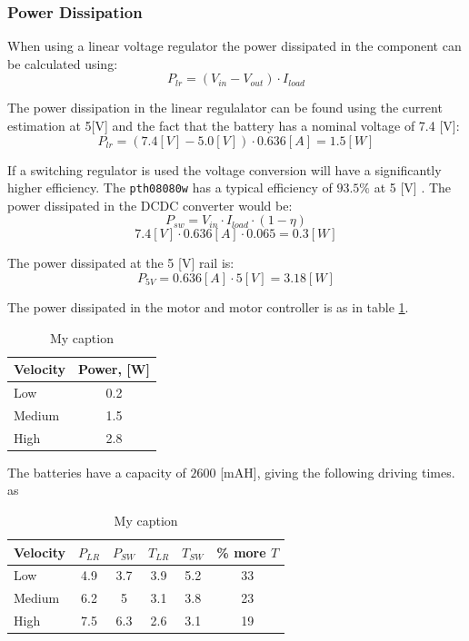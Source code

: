 \subsubsection{Power Dissipation} %
\label{sec:power_dissipation}
When using a linear voltage regulator the power dissipated in the component can be calculated using:
$$P_{lr} = (V_{in} - V_{out}) \cdot I_{load}$$

The power dissipation in the linear regulalator can be found using the current estimation at 5[V] and the fact that the battery has a nominal voltage of 7.4 [V]:
$$P_{lr} = (7.4 [V] - 5.0 [V]) \cdot 0.636 [A] = 1.5 [W]$$

If a switching regulator is used the voltage conversion will have a significantly higher efficiency.
The \texttt{pth08080w} has a typical efficiency of $93.5\%$ at 5 [V] \cite{pth08080}.
The power dissipated in the DCDC converter would be:
$$P_{sw} = V_{in} \cdot I_{load} \cdot (1 - \eta) $$
$$7.4 [V] \cdot 0.636 [A] \cdot 0.065 = 0.3 [W]$$


The power dissipated at the 5 [V] rail is:
$$P_{5V} = 0.636 [A] \cdot 5 [V] = 3.18 [W]$$

The power dissipated in the motor and motor controller is as in table \ref{tab:power_motor}.

\begin{table}[h]
\centering
\caption{My caption}
\label{tab:power_motor}
\begin{tabular}{|l|c|}
\hline
\textbf{Velocity} & Power, [W]     \\ \hline
Low       & 0.2 \\ \hline
Medium & 1.5 \\ \hline
High         & 2.8 \\ \hline
\end{tabular}
\end{table}

The batteries have a capacity of $2600$ [mAH], giving the following driving times. as

\begin{table}[h]
	\centering
	\caption{My caption}
	\label{my-label}
	\begin{tabular}{|l|c|c|c|c|c|}
		\hline
		\textbf{Velocity} & $P_{LR}$ & $P_{SW}$ & $T_{LR}$& $T_{SW}$ & \% \textbf{more} $T$ \\ \hline
		Low       & 4.9                         & 3.7                               & 3.9              & 5.2                      & 33                 \\ \hline
		Medium  & 6.2                         & 5                                 & 3.1              & 3.8                      & 23                 \\ \hline
		High      & 7.5                         & 6.3                               & 2.6              & 3.1                      & 19                 \\ \hline
	\end{tabular}
\end{table}

